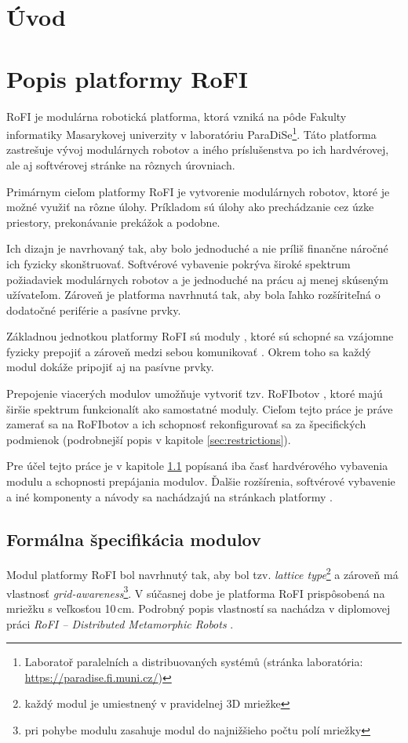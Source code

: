 \documentclass[
  digital, %
  twoside, %
  table,   %
  nolof,     %
  nolot,     %
]{fithesis3}
\begin{document}
\chapter*{Úvod}

\chapter{Popis platformy RoFI}
\label{sec:platform}
RoFI je modulárna robotická platforma, ktorá vzniká na pôde Fakulty informatiky Masarykovej univerzity v laboratóriu ParaDiSe\footnote{Laboratoř paralelních a distribuovaných systémů (stránka laboratória: \url{https://paradise.fi.muni.cz/})}. Táto platforma zastrešuje vývoj modulárnych robotov a iného príslušenstva po ich hardvérovej, ale aj softvérovej stránke na rôznych úrovniach. 

Primárnym cieľom platformy RoFI je vytvorenie modulárnych robotov, ktoré je možné využiť na rôzne úlohy. Príkladom sú úlohy ako prechádzanie cez úzke priestory, prekonávanie prekážok a podobne. 

Ich dizajn je navrhovaný tak, aby bolo jednoduché a nie príliš finančne náročné ich fyzicky skonštruovať. Softvérové vybavenie pokrýva široké spektrum požiadaviek modulárnych robotov a je jednoduché na prácu aj menej skúseným užívateľom. Zároveň je platforma navrhnutá tak, aby bola ľahko rozšíriteľná o dodatočné periférie a pasívne prvky. 

Základnou jednotkou platformy RoFI sú moduly \cite{mrazekMasterThesis}, ktoré sú schopné sa vzájomne fyzicky prepojiť a zároveň medzi sebou komunikovať \cite{rofiCom}. Okrem toho sa každý modul dokáže pripojiť aj na pasívne prvky. 

Prepojenie viacerých modulov umožňuje vytvoriť tzv. RoFIbotov \cite{rofiWeb}, ktoré majú širšie spektrum funkcionalít ako samostatné moduly. Cieľom tejto práce je práve zamerať sa na RoFIbotov a ich schopnosť rekonfigurovať sa za špecifických podmienok (podrobnejší popis v kapitole \ref{sec:restrictions}). 

Pre účel tejto práce je v kapitole \ref{sec:moduleSpec} popísaná iba časť hardvérového vybavenia modulu a schopnosti prepájania modulov. Ďalšie rozšírenia, softvérové vybavenie a iné komponenty a návody sa nachádzajú na stránkach platformy \cite{rofiWeb}. 

\section{Formálna špecifikácia modulov}
\label{sec:moduleSpec}
Modul platformy RoFI bol navrhnutý tak, aby bol tzv. \textit{lattice type}\footnote{každý modul je umiestnený v pravidelnej 3D mriežke} a zároveň má vlastnosť \textit{grid-awareness}\footnote{pri pohybe modulu zasahuje modul do najnižšieho počtu polí mriežky}. V súčasnej dobe je platforma RoFI prispôsobená na mriežku s veľkosťou 10\,cm. Podrobný popis vlastností sa nachádza v diplomovej práci \textit{RoFI – Distributed Metamorphic Robots} \cite{mrazekMasterThesis}. 
\end{document}
